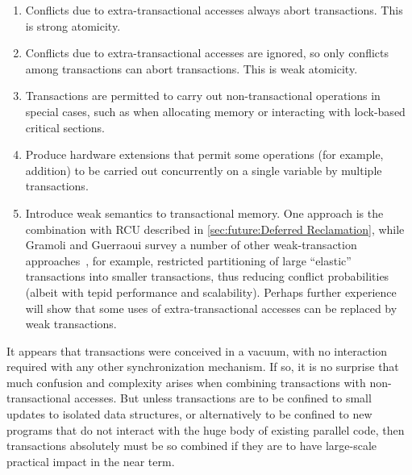 \begin{enumerate}
\item	Conflicts due to extra-transactional accesses always abort
	transactions.
	This is strong atomicity.
\item	Conflicts due to extra-transactional accesses are ignored,
	so only conflicts among transactions can abort transactions.
	This is weak atomicity.
\item	Transactions are permitted to carry out non-transactional
	operations in special cases, such as when allocating memory or
	interacting with lock-based critical sections.
\item	Produce hardware extensions that permit some operations
	(for example, addition) to be carried out concurrently on a
	single variable by multiple transactions.
\item	Introduce weak semantics to transactional memory.
	One approach is the combination with RCU described in
	\cref{sec:future:Deferred Reclamation},
	while Gramoli and Guerraoui
	survey a number of other weak-transaction
	approaches~\cite{Gramoli:2014:DTP:2541883.2541900}, for example,
	restricted partitioning of large
	``elastic'' transactions into smaller transactions, thus
	reducing conflict probabilities (albeit with tepid performance
	and scalability).
	Perhaps further experience will show that some uses of
	extra-transactional accesses can be replaced by weak
	transactions.
\end{enumerate}

It appears that transactions were conceived in a vacuum, with no
interaction required with any other synchronization mechanism.
If so, it is no surprise that much confusion and complexity arises when
combining transactions with non-transactional accesses.
But unless transactions are to be confined to small updates to isolated
data structures, or alternatively to be confined to new programs
that do not interact with the huge body of existing parallel code,
then transactions absolutely must be so combined if they are to have
large-scale practical impact in the near term.


